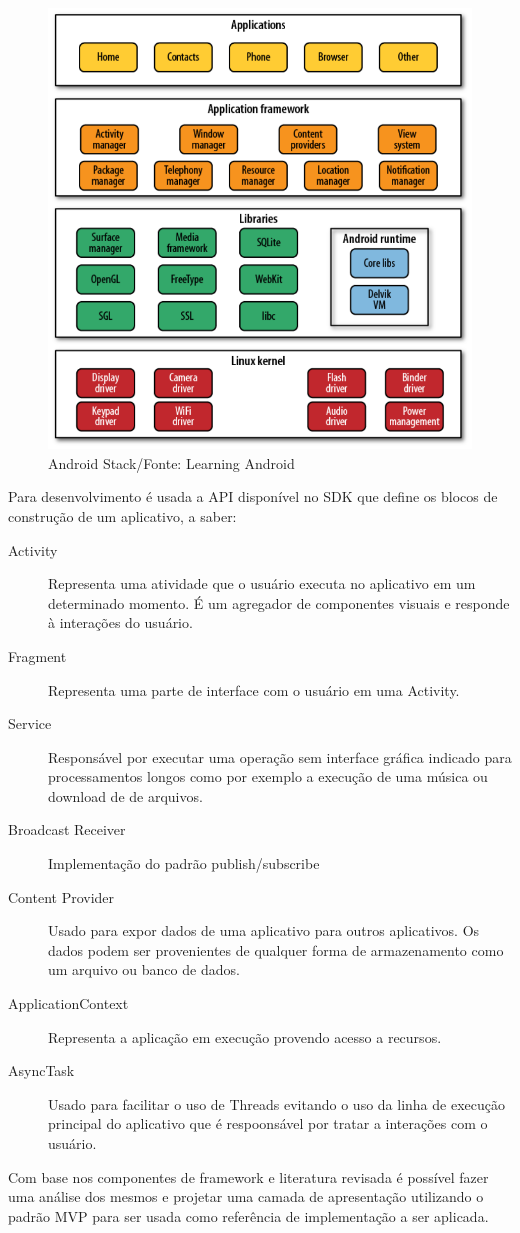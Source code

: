 \begin{figure}[h]
	\centering
	\includegraphics[scale=0.5]{img/android_stack.png}
	\caption{Android Stack/Fonte: Learning Android}
	\label{android_stack}
\end{figure}

Para desenvolvimento é usada a API disponível no SDK que define
os blocos de construção de um aplicativo, a saber:

\begin{description}
  \item[Activity] Representa uma atividade que o usuário executa no aplicativo
  em um determinado momento. É um agregador de componentes visuais e responde à
  interações do usuário.
  \item[Fragment] Representa uma parte de interface com o usuário em uma
  Activity.
  \item[Service] Responsável por executar uma operação sem interface gráfica
  indicado para processamentos longos como por exemplo a execução de uma música
  ou download de de arquivos.
  \item[Broadcast Receiver] Implementação do padrão publish/subscribe 
  \item[Content Provider] Usado para expor dados de uma aplicativo para outros
  aplicativos. Os dados podem ser provenientes de qualquer forma de
  armazenamento como um arquivo ou banco de dados.
  \item[ApplicationContext] Representa a aplicação em execução provendo acesso
  a recursos.
  \item[AsyncTask] Usado para facilitar o uso de Threads evitando o uso
  da linha de execução principal do aplicativo que é respoonsável por tratar a
  interações com o usuário.
\end{description}

Com base nos componentes de framework e literatura revisada é possível fazer
uma análise dos mesmos e projetar uma camada de apresentação utilizando o padrão
MVP para ser usada como referência de implementação a ser aplicada.